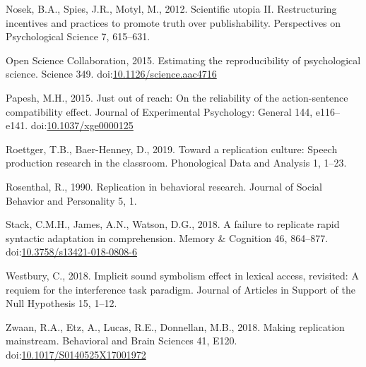 \documentclass[]{elsarticle} %
\newlength{\cslhangindent}
\newlength{\cslentryspacingunit} %
\newenvironment{CSLReferences}[2] %
 {%
  \setlength{\parindent}{0pt}
  \ifodd #1
  \let\oldpar\par
  \def\par{\hangindent=\cslhangindent\oldpar}
  \fi
  \setlength{\parskip}{#2\cslentryspacingunit}
 }%
 {}
\begin{document}
\begin{CSLReferences}{1}{0}
\leavevmode{}%
Nosek, B.A., Spies, J.R., Motyl, M., 2012. Scientific utopia {II}.
{Restructuring} incentives and practices to promote truth over
publishability. Perspectives on Psychological Science 7, 615--631.

\leavevmode{}%
Open Science Collaboration, 2015. Estimating the reproducibility of
psychological science. Science 349.
doi:\href{https://doi.org/10.1126/science.aac4716}{10.1126/science.aac4716}

\leavevmode{}%
Papesh, M.H., 2015. Just out of reach: {On} the reliability of the
action-sentence compatibility effect. Journal of Experimental
Psychology: General 144, e116--e141.
doi:\href{https://doi.org/10.1037/xge0000125}{10.1037/xge0000125}

\leavevmode{}%
Roettger, T.B., Baer-Henney, D., 2019. Toward a replication culture:
{Speech} production research in the classroom. Phonological Data and
Analysis 1, 1--23.

\leavevmode{}%
Rosenthal, R., 1990. Replication in behavioral research. Journal of
Social Behavior and Personality 5, 1.

\leavevmode{}%
Stack, C.M.H., James, A.N., Watson, D.G., 2018. A failure to replicate
rapid syntactic adaptation in comprehension. Memory \& Cognition 46,
864--877.
doi:\href{https://doi.org/10.3758/s13421-018-0808-6}{10.3758/s13421-018-0808-6}

\leavevmode{}%
Westbury, C., 2018. Implicit sound symbolism effect in lexical access,
revisited: {A} requiem for the interference task paradigm. Journal of
Articles in Support of the Null Hypothesis 15, 1--12.

\leavevmode{}%
Zwaan, R.A., Etz, A., Lucas, R.E., Donnellan, M.B., 2018. Making
replication mainstream. Behavioral and Brain Sciences 41, E120.
doi:\href{https://doi.org/10.1017/S0140525X17001972}{10.1017/S0140525X17001972}

\end{CSLReferences}
\end{document}
